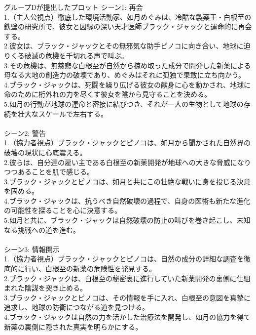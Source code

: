 \documentclass[a4j,12pt]{jsreport}
\begin{document}
\vspace{20pt}
\begin{breakitembox}
   [l]{グループDが提出したプロット}
   \noindent シーン1: 再会\\
   1.（主人公視点）徹底した環境活動家、如月めぐみは、冷酷な製薬王・白根至の鉄壁の研究所で、彼女と因縁の深い天才医師ブラック・ジャックと運命的に再会する。\\
   2.彼女は、ブラック・ジャックとその無邪気な助手ピノコに向き合い、地球に迫りくる破滅の危機を千切れる声で叫ぶ。\\
   3.その危機は、無慈悲な白根至が自然から掠め取った成分で開発した新薬による母なる大地の創造力の破壊であり、めぐみはそれに孤独で果敢に立ち向かう。\\
   4.ブラック・ジャックは、死闘を繰り広げる彼女の献身に心を動かされ、地球に命のために桁外れの力を尽くす彼女を陰から見守ることを決める。\\
   5.如月の行動が地球の運命と密接に結びつき、それが一人の生物として地球の存続を壮大なスケールで左右する。\\
   \\
   シーン2: 警告\\
   1.（協力者視点）ブラック・ジャックとピノコは、如月から聞かされた自然界の破壊の現状に心底震える。\\
   2.彼らは、自分達の雇い主である白根至の新薬開発が地球への大きな脅威になりつつあることを肌で感じる。\\
   3.ブラック・ジャックとピノコは、如月と共にこの壮絶な戦いに身を投じる決意を固める。\\
   4.ブラック・ジャックは、抗うべき自然破壊の過程で、自身の医術も新たな進化の可能性を探ることを心に決意する。\\
   5.如月と共に、ブラック・ジャックは自然破壊の防止の叫びを巻き起こし、未知なる挑戦への道を進む。\\
   \\
   シーン3: 情報開示\\
   1.（協力者視点）ブラック・ジャックとピノコは、自然の成分の詳細な調査を徹底的に行い、白根至の新薬の危険性を発見する。\\
   2.ブラック・ジャックは、白根至の秘密裏に進行していた新薬開発の裏側に仕組まれた陰謀を突き止める。\\
   3.ブラック・ジャックとピノコは、その情報を手に入れ、白根至の意図を真摯に追求し、地球の防衛につながる道を見つける。\\
   4.ブラック・ジャックは自然の力を活かした治療法を開発し、如月の協力を得て新薬の裏側に隠された真実を明らかにする。\\

\end{breakitembox}
\end{document}
